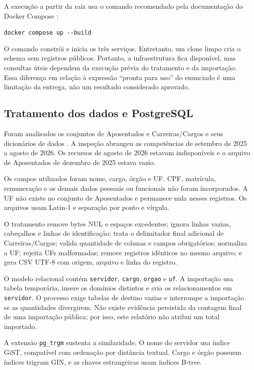 \documentclass[12pt]{article}
\newcommand{\code}[1]{\texttt{#1}}
\begin{document}
A execução a partir da raiz usa o comando recomendado pela documentação do
Docker Compose \cite{dockerCompose}:

\begin{center}
\code{docker compose up -{}-build}
\end{center}

O comando constrói e inicia os três serviços. Entretanto, um clone limpo cria
o schema sem registros públicos. Portanto, a infraestrutura fica disponível,
mas consultas úteis dependem da execução prévia do tratamento e da importação.
Essa diferença em relação à expressão ``pronta para uso'' do enunciado é uma
limitação da entrega, não um resultado considerado aprovado.

\subsection{Tratamento dos dados e PostgreSQL}

Foram analisados os conjuntos de Aposentados e Carreiras/Cargos e seus
dicionários de dados \cite{dicionarioAposentados,dicionarioCarreiras}. A
inspeção abrangeu as competências de setembro de 2025 a agosto de 2026. Os
recursos de agosto de 2026 estavam indisponíveis e o arquivo de Aposentados de
dezembro de 2025 estava vazio.

Os campos utilizados foram nome, cargo, órgão e UF. CPF, matrícula,
remuneração e os demais dados pessoais ou funcionais não foram incorporados. A
UF não existe no conjunto de Aposentados e permanece nula nesses registros. Os
arquivos usam Latin-1 e separação por ponto e vírgula.

O tratamento remove bytes NUL e espaços excedentes; ignora linhas vazias,
cabeçalhos e linhas de identificação; trata o delimitador final adicional de
Carreiras/Cargos; valida quantidade de colunas e campos obrigatórios;
normaliza a UF; rejeita UFs malformadas; remove registros idênticos no mesmo
arquivo; e gera CSV UTF-8 com origem, arquivo e linha do registro.

O modelo relacional contém \code{servidor}, \code{cargo}, \code{orgao} e
\code{uf}. A importação usa tabela temporária, insere os domínios distintos e
cria os relacionamentos em \code{servidor}. O processo exige tabelas de destino
vazias e interrompe a importação se as quantidades divergirem. Não existe
evidência persistida da contagem final de uma importação pública; por isso, este
relatório não atribui um total importado.

A extensão \code{pg\_trgm} sustenta a similaridade. O nome do servidor usa
índice GiST, compatível com ordenação por distância textual. Cargo e órgão
possuem índices trigram GIN, e as chaves estrangeiras usam índices B-tree.
\end{document}
